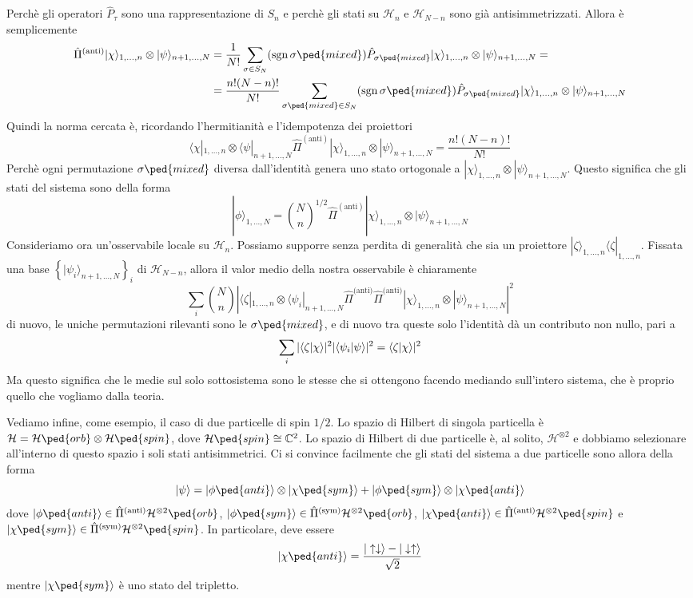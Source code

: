 \documentclass[a4paper, 11pt]{article}
\newcommand{\op}[1]{\hat{#1}}
\renewcommand{\H}{\mathcal{H}}
\renewcommand{\op}[1]{\hat{#1}}
\renewcommand{\ket}[1]{| #1\rangle}
\renewcommand{\bra}[1]{\langle #1|}
\begin{document}
Perchè gli operatori $\op P_\tau$ sono una rappresentazione di $S_n$ e perchè gli stati su $\H_n$ e $\H_{N-n}$ sono già antisimmetrizzati. Allora è semplicemente
\begin{align*}\op{\Pi}^{(\textrm{anti})}\ket{\chi}_{1,\ldots,n}\otimes\ket{\psi}_{n+1,\ldots,N}&=\frac{1}{N!}\sum_{\sigma\in S_N}(\mathrm{sgn}\,\sigma\ped{mixed})\op P_{\sigma\ped{mixed}}\ket{\chi}_{1,\ldots,n}\otimes\ket{\psi}_{n+1,\ldots,N}=\\&=\frac{n!(N-n)!}{N!}\sum_{\sigma\ped{mixed}\in S_N}(\mathrm{sgn}\,\sigma\ped{mixed})\op P_{\sigma\ped{mixed}}\ket{\chi}_{1,\ldots,n}\otimes\ket{\psi}_{n+1,\ldots,N}\end{align*}
Quindi la norma cercata è, ricordando l'hermitianità e l'idempotenza dei proiettori
\[\bra{\chi}_{1,\ldots,n}\otimes\bra{\psi}_{n+1,\ldots,N}\op{\Pi}^{(\textrm{anti})}\ket{\chi}_{1,\ldots,n}\otimes\ket{\psi}_{n+1,\ldots,N}=\frac{n!(N-n)!}{N!}\]
Perchè ogni permutazione $\sigma\ped{mixed}$ diversa dall'identità genera uno stato ortogonale a $\ket{\chi}_{1,\ldots,n}\otimes\ket{\psi}_{n+1,\ldots,N}$. Questo significa che gli stati del sistema sono della forma
\[\ket{\phi}_{1,\ldots,N}={\binom{N}{n}}^{1/2}\op{\Pi}^{(\textrm{anti})}\ket{\chi}_{1,\ldots,n}\otimes\ket{\psi}_{n+1,\ldots,N}\]
Consideriamo ora un'osservabile locale su $\H_n$. Possiamo supporre senza perdita di generalità che sia un proiettore $\ket{\zeta}_{1,\ldots,n}\bra{\zeta}_{1,\ldots,n}$. Fissata una base $\left\{\ket{\psi_i}_{n+1,\ldots,N}\right\}_i$ di $\H_{N-n}$, allora il valor medio della nostra osservabile è chiaramente
\[\sum_i\binom{N}{n}\left|\bra{\zeta}_{1,\ldots,n}\otimes\bra{\psi_i}_{n+1,\ldots,N}\op{\Pi}^{\textrm{(anti)}}\op{\Pi}^{\textrm{(anti)}}\ket{\chi}_{1,\ldots,n}\otimes\ket{\psi}_{n+1,\ldots,N}\right|^2\]
di nuovo, le uniche permutazioni rilevanti sono le $\sigma\ped{mixed}$, e di nuovo tra queste solo l'identità dà un contributo non nullo, pari a 
\[\sum_{i}|\langle \zeta\vert\chi\rangle|^2|\langle \psi_i\vert\psi\rangle|^2=\langle \zeta\vert\chi\rangle|^2\]
Ma questo significa che le medie sul solo sottosistema sono le stesse che si ottengono facendo mediando sull'intero sistema, che è proprio quello che vogliamo dalla teoria.

Vediamo infine, come esempio, il caso di due particelle di spin $1/2$. Lo spazio di Hilbert di singola particella è $\H=\H\ped{orb}\otimes\H\ped{spin}$, dove $\H\ped{spin}\cong\C^2$. Lo spazio di Hilbert di due particelle è, al solito, $\H^{\otimes 2}$ e dobbiamo selezionare all'interno di questo spazio i soli stati antisimmetrici. Ci si convince facilmente che gli stati del sistema a due particelle sono allora della forma
\[\ket{\psi}=\ket{\phi\ped{anti}}\otimes\ket{\chi\ped{sym}}+\ket{\phi\ped{sym}}\otimes\ket{\chi\ped{anti}}\]
dove $\ket{\phi\ped{anti}}\in\op{\Pi}^{(\textrm{anti})}\H^{\otimes2}\ped{orb}$, $\ket{\phi\ped{sym}}\in\op{\Pi}^{(\textrm{sym})}\H^{\otimes2}\ped{orb}$, $\ket{\chi\ped{anti}}\in\op{\Pi}^{(\textrm{anti})}\H^{\otimes2}\ped{spin}$ e $\ket{\chi\ped{sym}}\in\op{\Pi}^{(\textrm{sym})}\H^{\otimes2}\ped{spin}$. In particolare, deve essere
\[\ket{\chi\ped{anti}}=\frac{\ket{\uparrow\downarrow}-\ket{\downarrow\uparrow}}{\sqrt{2}}\]
mentre $\ket{\chi\ped{sym}}$ è uno stato del tripletto.
\end{document}
